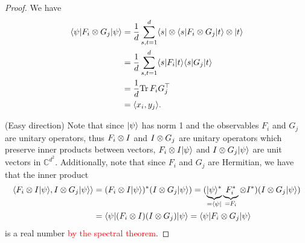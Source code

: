 \begin{proof}
		We have
		\begin{align*}
			\langle {\psi} \vert F_i\otimes G_j \vert {\psi} \rangle &= \frac{1}{d} \sum_{s,t=1}^d \langle {s} \vert\otimes\langle {s} \vert F_i\otimes G_j \vert {t} \rangle\otimes \vert {t} \rangle \\
			&= \frac{1}{d} \sum_{s,t=1}^d \langle {s} \vert F_i \vert {t} \rangle \langle {s} \vert G_j \vert {t} \rangle \\
			&= \frac{1}{d} \textup{Tr} \, {F_iG_j^\top} \\
			&= \langle{x_i},{y_j}\rangle.
		\end{align*}
		
		(Easy direction) Note that since $\vert {\psi} \rangle$ has norm 1 and the observables $F_i$ and $G_j$ are unitary operators, thus $F_i\otimes I$ and $I\otimes G_j$ are unitary operators which preserve inner products between vectors, $F_i\otimes I \vert {\psi} \rangle$ and $I\otimes G_j\vert {\psi} \rangle$ are unit vectors in $\mathbb{C}^{d^2}$. Additionally, note that since $F_i$ and $G_j$ are Hermitian, we have that the inner product
		\begin{align*}
			\sclr{F_i\tensor I \dr{\psi}}{I\tensor G_j \dr{\psi}} &= (F_i\tensor I \dr{\psi})^\ast(I\tensor G_j \dr{\psi}) 
			= (\underbrace{\dr{\psi}^\ast}_{=\dl{\psi}}\underbrace{F_i^\ast}_{=F_i}\tensor I^\ast)(I\tensor G_j \dr{\psi}) \\
			&= \dl{\psi}(F_i\tensor I)(I \tensor G_j) \dr{\psi}	%
			= \dl{\psi} F_i\tensor G_j \dr{\psi}
		\end{align*}
		is a real number \textcolor{red}{by the spectral theorem}.
		

\end{proof}
